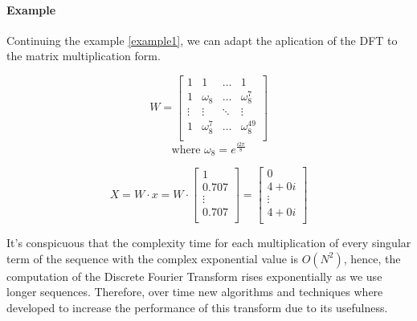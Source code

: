 \documentclass[
  oneside,
  11pt, a4paper,
  footinclude=true,
  headinclude=true,
  cleardoublepage=empty
]{scrbook}
\begin{document}
\paragraph{Example} \label{example1.2} Continuing the example \ref{example1}, we can adapt the aplication of the DFT to the matrix multiplication form.

\begin{equation*}
    W =
    \begin{bmatrix}
        1      & 1              & \dots  & 1               \\
        1      & \omega_{8}     & \dots  & \omega_{8}^{7}  \\
        \vdots & \vdots         & \ddots & \vdots          \\
        1      & \omega_{8}^{7} & \dots  & \omega_{8}^{49} \\
    \end{bmatrix}
\end{equation*}
\begin{equation*}
    \text{where } \omega_{8} = e^{\frac{i 2 \pi}{8}}
\end{equation*}

\begin{equation*}
    X = W \cdot x = W \cdot 
    \begin{bmatrix}
        1      \\
        0.707  \\
        \vdots \\
        0.707  \\
    \end{bmatrix} =
    \begin{bmatrix}
        0      \\
        4+0i  \\
        \vdots \\
        4+0i  \\
    \end{bmatrix}
\end{equation*}


\hfill \break
It's conspicuous that the complexity time for each multiplication of every singular term of the sequence with the complex exponential value is \(O(N^{2})\), hence, the computation of the Discrete Fourier Transform rises exponentially as we use longer sequences. Therefore, over time new algorithms and techniques where developed to increase the performance of this transform due to its usefulness. 
\end{document}
